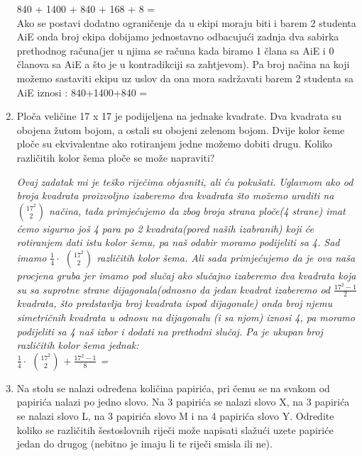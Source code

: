 \documentclass[12pt]{article}
\begin{document}
\begin{enumerate}
\begin{center}
{		840 + 1400 + 840 + 168 + 8 = \\
		\vspace{0.75cm}
		Ako se postavi dodatno ograničenje da u ekipi moraju biti i barem 2 studenta AiE onda broj ekipa dobijamo jednostavno odbacujući zadnja dva sabirka prethodnog računa(jer u njima se računa kada biramo 1 člana sa AiE i 0 članova sa AiE a što je u kontradikciji sa zahtjevom).
		Pa broj načina na koji možemo sastaviti ekipu uz uslov da ona mora sadržavati barem 2 studenta sa AiE iznosi : 840+1400+840 = }
	    \end{center}
	    \vspace{0.75cm}
		\item Ploča veličine 17 x 17 je podijeljena na jednake kvadrate. Dva kvadrata su obojena žutom bojom, a ostali su obojeni zelenom bojom. Dvije kolor šeme ploče su ekvivalentne ako rotiranjem jedne možemo dobiti drugu. Koliko različitih kolor šema ploče se može napraviti?
		\newpage
		\begin{center}
		\textit{Ovaj zadatak mi je teško riječima objasniti, ali ću pokušati. Uglavnom ako od broja kvadrata proizvoljno izaberemo dva kvadrata što možemo uraditi na $17^2 \choose 2$ načina, tada primjećujemo da zbog broja strana ploče(4 strane) imat ćemo sigurno još 4 para po 2 kvadrata(pored naših izabranih) koji će rotiranjem dati istu kolor šemu, pa naš odabir moramo podijeliti sa 4. Sad imamo $\frac{1}{4} \cdot$ $17^2 \choose 2$ različitih kolor šema. Ali sada primjećujemo da je ova naša procjena gruba jer imamo pod slučaj ako slučajno izaberemo dva kvadrata koja su sa suprotne strane dijagonala(odnosno da jedan kvadrat izaberemo od $\frac{17^2 - 1}{2}$ kvadrata, što predstavlja broj kvadrata ispod dijagonale) onda broj njemu simetričnih kvadrata u odnosu na dijagonalu (i sa njom) iznosi 4, pa moramo podijeliti sa 4 naš izbor i dodati na prethodni slučaj. Pa je ukupan broj različitih kolor šema jednak:
		\\
		$\frac{1}{4} \cdot$ $17^2 \choose 2$ $+\ \frac{17^2 - 1}{8}$ = }
	    \end{center}
		\item Na stolu se nalazi određena količina papirića, pri čemu se na svakom od papirića nalazi po jedno slovo. Na 3 papirića se nalazi slovo X, na 3 papirića se nalazi slovo L, na 3 papirića slovo M i na 4 papirića slovo Y. Odredite koliko se različitih šestoslovnih riječi može napisati slažući uzete papiriće jedan do drugog (nebitno je imaju li te riječi smisla ili ne).
		\begin{center}

\end{center}
\end{enumerate}
\end{document}
